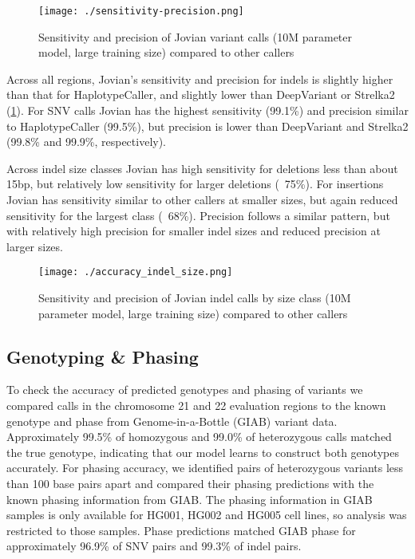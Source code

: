 \documentclass[]{article}
\begin{document}
\begin{figure}[htp]
	\texttt{[image: ./sensitivity-precision.png]}
	\caption{ Sensitivity and precision of Jovian variant calls (10M parameter model, large training size) compared to other callers }
	\label{fig:sens-ppv}
\end{figure}


Across all regions, Jovian's sensitivity and precision for indels is slightly higher than that for HaplotypeCaller, and slightly lower than DeepVariant or Strelka2 (\ref{fig:sens-ppv}). For SNV calls Jovian has the highest sensitivity (99.1\%) and precision similar to HaplotypeCaller (99.5\%), but precision is lower than DeepVariant and Strelka2 (99.8\% and 99.9\%, respectively).


Across indel size classes Jovian has high sensitivity for deletions less than about 15bp, but relatively low sensitivity for larger deletions (~75\%). For insertions Jovian has sensitivity similar to other callers at smaller sizes, but again reduced sensitivity for the largest class (~68\%). Precision follows a similar pattern, but with relatively high precision for smaller indel sizes and reduced precision at larger sizes. 

\begin{figure}[htp]
	\texttt{[image: ./accuracy\_indel\_size.png]}
	\caption{ Sensitivity and precision of Jovian indel calls by size class (10M parameter model, large training size) compared to other callers }
	\label{fig:indelsize-sens-ppv}
\end{figure}


\subsection{Genotyping \& Phasing}

To check the accuracy of predicted genotypes and phasing of variants we compared calls in the chromosome 21 and 22 evaluation regions to the known genotype and phase from Genome-in-a-Bottle (GIAB) variant data. Approximately 99.5\% of homozygous and 99.0\% of heterozygous calls matched the true genotype, indicating that our model learns to construct both genotypes accurately.  For phasing accuracy, we identified pairs of heterozygous variants less than 100 base pairs apart and compared their phasing predictions with the known phasing information from GIAB. The phasing information in GIAB samples is only available for HG001, HG002 and HG005 cell lines, so analysis was restricted to those samples. Phase predictions matched GIAB phase for approximately 96.9\% of SNV pairs and 99.3\% of indel pairs.
\end{document}
